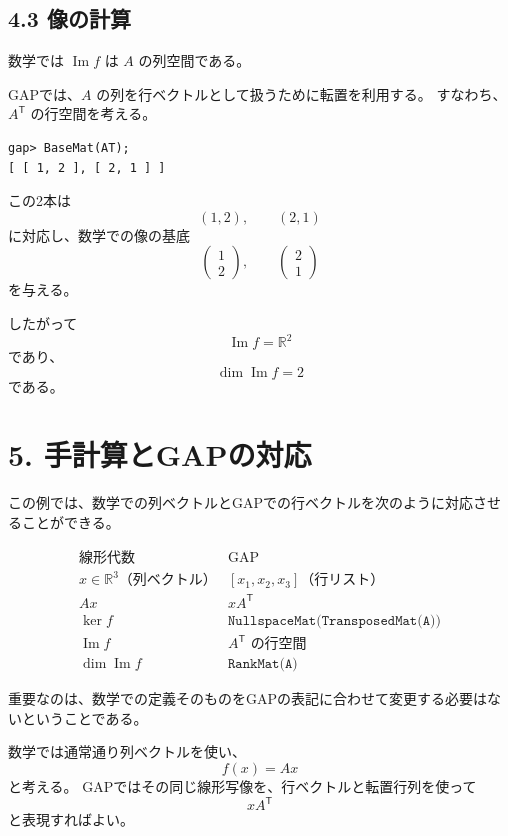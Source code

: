 \documentclass[a4paper,11pt]{ltjsarticle}
\begin{document}
\subsection*{4.3 像の計算}

数学では $\operatorname{Im}f$ は $A$ の列空間である。

GAPでは、$A$ の列を行ベクトルとして扱うために転置を利用する。
すなわち、$A^{\mathsf T}$ の行空間を考える。

\begin{lstlisting}
gap> BaseMat(AT);
[ [ 1, 2 ], [ 2, 1 ] ]
\end{lstlisting}

この2本は
\[
(1,2),\qquad(2,1)
\]
に対応し、数学での像の基底
\[
\begin{pmatrix}1\\2\end{pmatrix},
\qquad
\begin{pmatrix}2\\1\end{pmatrix}
\]
を与える。

したがって
\[
\boxed{\operatorname{Im}f=\mathbb R^2}
\]
であり、
\[
\dim\operatorname{Im}f=2
\]
である。

\section*{5. 手計算とGAPの対応}

この例では、数学での列ベクトルとGAPでの行ベクトルを次のように対応させることができる。

\[
\begin{array}{c|c}
\text{線形代数} & \text{GAP}\\ \hline
x\in\mathbb R^3\text{（列ベクトル）}
&
[x_1,x_2,x_3]\text{（行リスト）}
\\[2mm]
Ax
&
xA^{\mathsf T}
\\[2mm]
\ker f
&
\texttt{NullspaceMat(TransposedMat(A))}
\\[2mm]
\operatorname{Im}f
&
A^{\mathsf T}\text{ の行空間}
\\[2mm]
\dim\operatorname{Im}f
&
\texttt{RankMat(A)}
\end{array}
\]

重要なのは、数学での定義そのものをGAPの表記に合わせて変更する必要はないということである。

数学では通常通り列ベクトルを使い、
\[
f(x)=Ax
\]
と考える。
GAPではその同じ線形写像を、行ベクトルと転置行列を使って
\[
xA^{\mathsf T}
\]
と表現すればよい。
\end{document}
